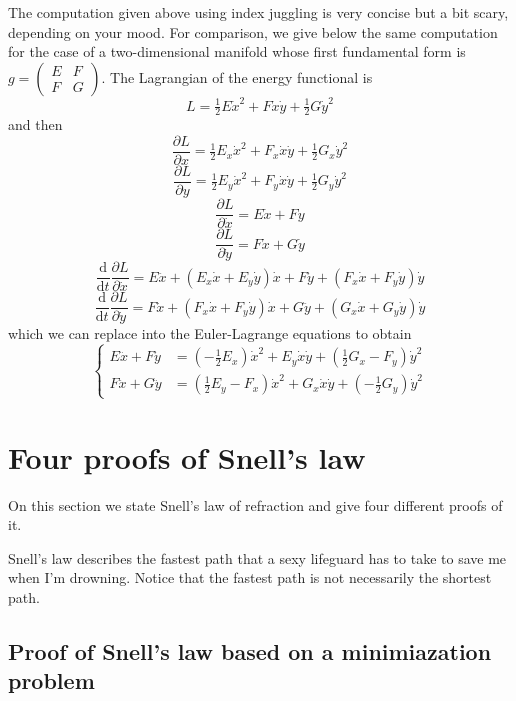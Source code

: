 The computation given above using index juggling is very concise but a bit
scary, depending on your mood.  For comparison, we give below the same
computation for the case of a two-dimensional manifold whose first
fundamental form
is~$g=\left(\begin{smallmatrix}E & F \\ F & G\end{smallmatrix}\right)$.  The
Lagrangian of the energy functional is
$$
L=
\tfrac{1}{2}E\dot x^2+F\dot x\dot y+\tfrac{1}{2}G\dot y^2
$$
and then
$$
\frac{\partial L}{\partial x}
=
\tfrac{1}{2}E_x\dot x^2+F_x\dot x\dot y+\tfrac{1}{2}G_x\dot y^2
$$
$$
\frac{\partial L}{\partial y}
=
\tfrac{1}{2}E_y\dot x^2+F_y\dot x\dot y+\tfrac{1}{2}G_y\dot y^2
$$
$$
\frac{\partial L}{\partial \dot x}
=
E\dot x+F\dot y
$$
$$
\frac{\partial L}{\partial \dot y}
=
F\dot x+G\dot y
$$
$$
\frac{\mathrm{d}}{\mathrm{d} t}
\frac{\partial L}{\partial \dot x}
=
E\ddot x
+\left(E_x\dot x+E_y\dot y\right)\dot x
+F\ddot y
+\left(F_x\dot x+F_y\dot y\right)\dot y
$$
$$
\frac{\mathrm{d}}{\mathrm{d} t}
\frac{\partial L}{\partial \dot y}
=
F\ddot x
+\left(F_x\dot x+F_y\dot y\right)\dot x
+G\ddot y
+\left(G_x\dot x+G_y\dot y\right)\dot y
$$
which we can replace into the Euler-Lagrange equations to obtain
$$
\begin{cases}
	E\ddot x+F\ddot y &=
	\left(-\tfrac{1}{2}E_x\right)\dot x^2
	+E_y\dot x\dot y
	+\left(\tfrac{1}{2}G_x-F_y\right)\dot y^2
	\\
	F\ddot x+G\ddot y &=
	\left(\tfrac{1}{2}E_y-F_x\right)\dot x^2
	+G_x\dot x\dot y
	+
	\left(-\tfrac{1}{2}G_y\right)\dot y^2
\end{cases}
$$




\section{Four proofs of Snell's law}

On this section we state Snell's law of refraction and give four different
proofs of it.

Snell's law describes the fastest path that a sexy lifeguard has to take to
save me when I'm drowning.  Notice that the fastest path is not necessarily the shortest path.

\subsection{Proof of Snell's law based on a minimiazation problem}

